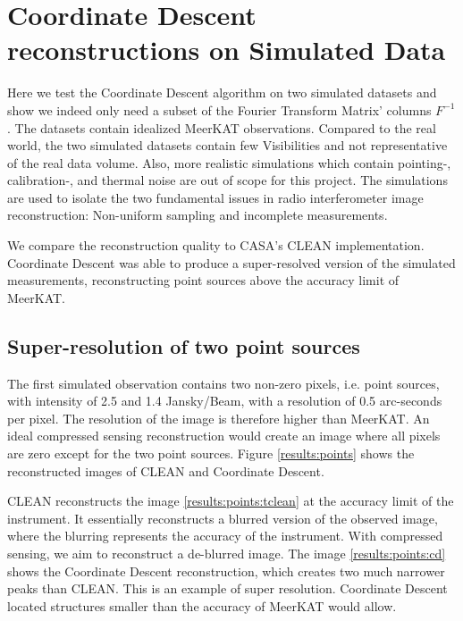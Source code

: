 \section{Coordinate Descent reconstructions on Simulated Data}\label{results}
Here we test the Coordinate Descent algorithm on two simulated datasets and show we indeed only need a subset of the Fourier Transform Matrix' columns $F^{-1}$. The datasets contain idealized MeerKAT observations. Compared to the real world, the two simulated datasets contain few Visibilities and not representative of the real data volume. Also, more realistic simulations which contain pointing-, calibration-, and thermal noise are out of scope for this project. The simulations are used to isolate the two fundamental issues in radio interferometer image reconstruction: Non-uniform sampling and incomplete measurements.

We compare the reconstruction quality to CASA's CLEAN implementation. Coordinate Descent was able to produce a super-resolved version of the simulated measurements, reconstructing point sources above the accuracy limit of MeerKAT.

\subsection{Super-resolution of two point sources}
The first simulated observation contains two non-zero pixels, i.e. point sources, with intensity of 2.5 and 1.4 Jansky/Beam, with a resolution of 0.5 arc-seconds per pixel. The resolution of the image is therefore higher than MeerKAT. An ideal compressed sensing reconstruction would create an image where all pixels are zero except for the two point sources. Figure \ref{results:points} shows the reconstructed images of CLEAN and Coordinate Descent.

CLEAN reconstructs the image \ref{results:points:tclean} at the accuracy limit of the instrument. It essentially reconstructs a blurred version of the observed image, where the blurring represents the accuracy of the instrument. With compressed sensing, we aim to reconstruct a de-blurred image. The image \ref{results:points:cd} shows the Coordinate Descent reconstruction, which creates two much narrower peaks than CLEAN. This is an example of super resolution. Coordinate Descent located structures smaller than the accuracy of MeerKAT would allow.

